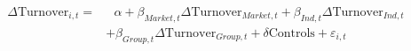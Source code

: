 \begin{equation*}
	\begin{split}
		\Delta \text{Turnover}_{i,t} =  & \text{	}\alpha + \beta_{Market,t} \Delta \text{Turnover}_{Market,t}  
		+ \beta_{Ind,t} \Delta \text{Turnover}_{Ind,t} \\ & + \beta_{Group,t} \Delta \text{Turnover}_{Group,t} + \delta\text{Controls} + \varepsilon_{i,t}
	\end{split}
\end{equation*}